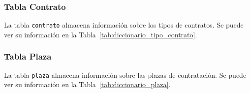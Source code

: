 \subsubsection{Tabla Contrato}
La tabla \texttt{contrato} almacena información sobre los tipos de contratos. Se puede ver su información en la Tabla~\ref{tab:diccionario_tipo_contrato}.

\begin{table}[h]
  \centering 
  \caption{Diccionario de datos. Tabla Tipo Contrato}
  \label{tab:diccionario_tipo_contrato}
\end{table}

\subsubsection{Tabla Plaza}
La tabla \texttt{plaza} almacena información sobre las plazas de contratación. Se puede ver su información en la Tabla~\ref{tab:diccionario_plaza}.

